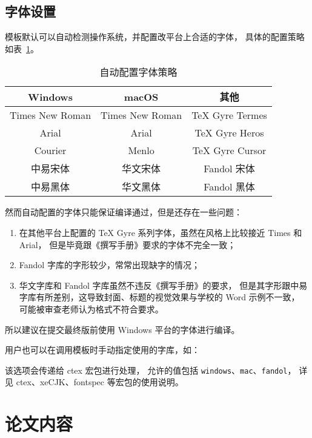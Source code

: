 \documentclass[a4paper]{ltxdoc}
\DeclareRobustCommand\pkg{\textsf}
\DeclareRobustCommand\opt{\texttt}
\begin{document}
\subsection{字体设置}
模板默认可以自动检测操作系统，并配置改平台上合适的字体，
具体的配置策略如表~\ref{tab:font}。
\begin{table}[htb]
    \centering
    \caption{自动配置字体策略}
    \label{tab:font}
    \begin{tabular}{ccc}
        \toprule
        Windows         & macOS           & 其他            \\
        \midrule
        Times New Roman & Times New Roman & TeX Gyre Termes \\
        Arial           & Arial           & TeX Gyre Heros  \\
        Courier         & Menlo           & TeX Gyre Cursor \\
        中易宋体        & 华文宋体        & Fandol 宋体     \\
        中易黑体        & 华文黑体        & Fandol 黑体     \\
        \bottomrule
    \end{tabular}
\end{table}

然而自动配置的字体只能保证编译通过，但是还存在一些问题：
\begin{enumerate}
    \item 在其他平台上配置的 TeX Gyre 系列字体，虽然在风格上比较接近 Times 和 Arial，
          但是毕竟跟《撰写手册》要求的字体不完全一致；
    \item Fandol 字库的字形较少，常常出现缺字的情况；
    \item 华文字库和 Fandol 字库虽然不违反《撰写手册》的要求，
          但是其字形跟中易字库有所差别，这导致封面、标题的视觉效果与学校的 Word 示例不一致，
          可能被审查老师认为格式不符合要求。
\end{enumerate}

所以建议在提交最终版前使用 Windows 平台的字体进行编译。

用户也可以在调用模板时手动指定使用的字库，如：
该选项会传递给 \pkg{ctex} 宏包进行处理，
允许的值包括 \opt{windows}、\opt{mac}、\opt{fandol}，
详见 \pkg{ctex}、\pkg{xeCJK}、\pkg{fontspec} 等宏包的使用说明。



\section{论文内容}
\end{document}
